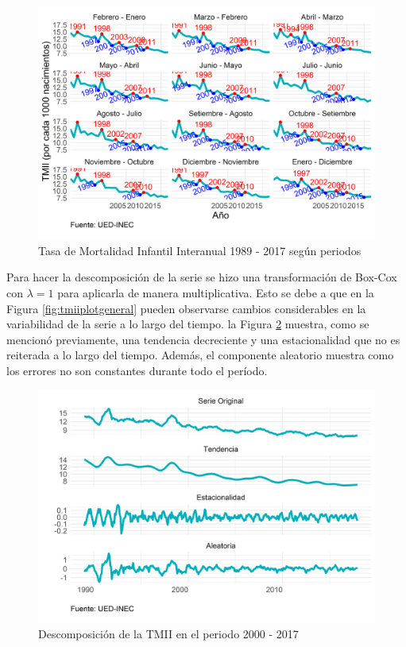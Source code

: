 \documentclass[
]{article}
\begin{document}
\begin{figure}[H]
\includegraphics[width=1\linewidth,height=1\textheight]{Tesis_files/figure-latex/tmiiplotperiodos-1} \caption{Tasa de Mortalidad Infantil Interanual 1989 - 2017 según periodos}\label{fig:tmiiplotperiodos}
\end{figure}

Para hacer la descomposición de la serie se hizo una transformación de
Box-Cox con \(\lambda=1\) para aplicarla de manera multiplicativa. Esto
se debe a que en la Figura \ref{fig:tmiiplotgeneral} pueden observarse
cambios considerables en la variabilidad de la serie a lo largo del
tiempo. la Figura \ref{fig:tmiiplotdescomposicion} muestra, como se
mencionó previamente, una tendencia decreciente y una estacionalidad que
no es reiterada a lo largo del tiempo. Además, el componente aleatorio
muestra como los errores no son constantes durante todo el período.

\begin{figure}[H]
\includegraphics[width=1\linewidth,height=1\textheight]{Tesis_files/figure-latex/tmiiplotdescomposicion-1} \caption{Descomposición de la TMII en el periodo 2000 - 2017}\label{fig:tmiiplotdescomposicion}
\end{figure}
\end{document}
